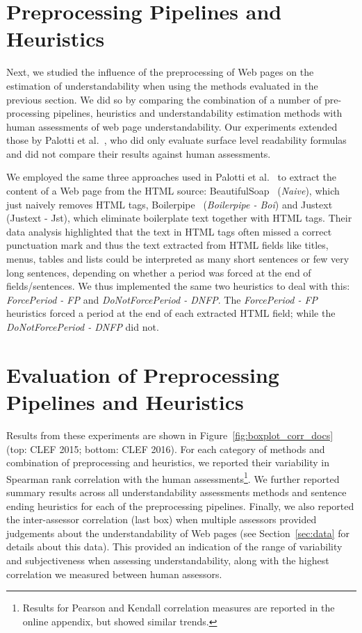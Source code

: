 \section{Preprocessing Pipelines and Heuristics}
\label{sec:pipelines}

Next, we studied the influence of the preprocessing of Web pages on the estimation of understandability when using the methods evaluated in the previous section. We did so by comparing the combination of a number of pre-processing pipelines, heuristics and understandability estimation methods with human assessments of web page understandability. 
Our experiments extended those by Palotti et al.~\cite{palotti15}, who did only evaluate surface level readability formulas and did not compare their results against human assessments. 

We employed the same three approaches used in Palotti et al.~\cite{palotti15} to extract the content of a Web page from the HTML source: BeautifulSoap~\cite{bs4} (\textit{Naive}), which just naively removes HTML tags, Boilerpipe~\cite{kohlschutter10} (\textit{Boilerpipe - Boi}) and Justext~\cite{jan11} ({Justext - Jst}), which eliminate boilerplate text together with HTML tags. 
Their data analysis highlighted that the text in HTML tags often missed a correct punctuation mark and thus the text extracted from HTML fields like titles, menus, tables and lists could be interpreted as many short sentences or few very long sentences, depending on whether a period was forced at the end of fields/sentences. We thus implemented the same two heuristics to deal with this: \textit{ForcePeriod - FP} and \textit{DoNotForcePeriod - DNFP}. The \textit{ForcePeriod - FP} heuristics forced a period at the end of each extracted HTML field; while the \textit{DoNotForcePeriod - DNFP} did not. 


\section{Evaluation of Preprocessing Pipelines and Heuristics}
\label{sec:which_preprocessing}
Results from these experiments are shown in Figure~\ref{fig:boxplot_corr_docs} (top: CLEF 2015; bottom: CLEF 2016). For each category of methods and combination of preprocessing and heuristics, we reported their variability in Spearman rank correlation with the human assessments\footnote{Results for Pearson and Kendall correlation measures are reported in the online appendix, but showed similar trends.}. We further reported summary results across all understandability assessments methods and sentence ending heuristics for each of the preprocessing pipelines. Finally, we also reported the inter-assessor correlation (last box) when multiple assessors provided judgements about the understandability of Web pages (see Section~\ref{sec:data} for details about this data). This provided an indication of the range of variability and subjectiveness when assessing understandability, along with the highest correlation we measured between human assessors. 

